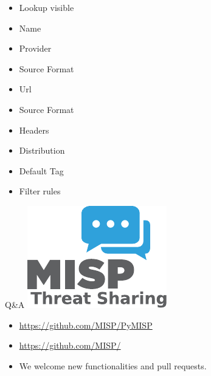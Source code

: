 \begin{frame}
\begin{minipage}{0.48\linewidth}
\begin{itemize}
                \item Lookup visible
                \item Name
                \item Provider
                \item Source Format
                \item Url
                \item Source Format
                \item Headers
                \item Distribution
                \item Default Tag
                \item Filter rules
            \end{itemize}
        \end{minipage}
\end{frame}

\begin{frame}[t,fragile] {Q\&A}
\includegraphics[scale=0.5]{misplogo.pdf}
\begin{itemize}
        \item \url{https://github.com/MISP/PyMISP}
        \item \url{https://github.com/MISP/}
        \item We welcome new functionalities and pull requests.
\end{itemize}

\end{frame}

